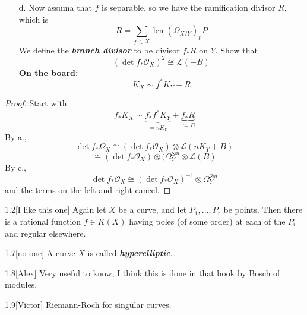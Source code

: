 \begin{enumerate}
	\item[d.] Now assuma that $f$ is separable, so we have the ramification divisor $R$, which is
\[R=\sum_{p\in X}\operatorname{len}\left( \Omega_{X/Y} \right)_pP\]
		We define the \textit{\textbf{branch divisor}} to be divisor $f_* R$ on $ Y$. Show that
		\[(\det f_* \mathcal{O}_X)^2\cong \mathcal{L}(-B)\]
		\textbf{On the board:}
		\[K_X\sim f^*K_Y+R\]
\end{enumerate}

\begin{proof}\leavevmode
	Start with
	\[f_* K_X\sim  \underbrace{f_* f^* K_Y}_{=nK_Y} +\underbrace{f_* R}_{:=B}\]
	By a.,
	\[\det f_*\Omega_X\cong (\det f_*\mathcal{O}_X)\otimes \mathcal{L}(nK_Y+B)\]
	\[\cong (\det f_*\mathcal{O}_X)\otimes(\Omega_Y^{\otimes n}\otimes \mathcal{L}(B)\]
By c.,	\[\det f_*\mathcal{O}_X\cong (\det f_*\mathcal{O}_X)^{-1}\otimes \Omega_Y^{\otimes n}\]
and the terms on the left and right cancel.

\end{proof}
















\begin{manualexercise}{1.2}[I like this one]
	Again let $X$ be a curve, and let $P_1,\ldots,P_r$ be points. Then there is a rational  function $f\in K(X)$ having poles (of some order) at each of the $P_i$ and regular  elsewhere.  
\end{manualexercise}

\begin{manualexercise}{1.7}[no one]
	A curve $X$ is called \textit{\textbf{hyperelliptic}}…
\end{manualexercise}

\begin{manualexercise}{1.8}[Alex]
	Very useful to know, I think this is done in that book by Bosch of modules,
\end{manualexercise}

\begin{manualexercise}{1.9}[Victor]
	Riemann-Roch for singular curves.
\end{manualexercise}

